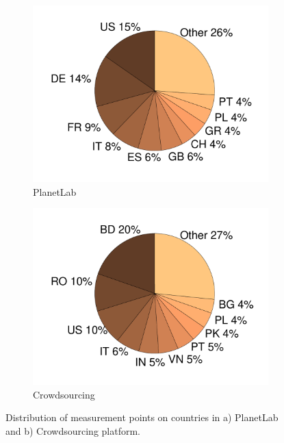 \begin{figure}[bt]
    \centering
	\begin{subfigure}[t]{0.49\textwidth}
	\includegraphics[width=\textwidth]{aslevel/crowd/figs/PLSrc.pdf}
\caption{PlanetLab}
\label{fig:PLSrc}
\end{subfigure}
\begin{subfigure}[t]{0.49\textwidth}
	\includegraphics[width=\textwidth]{aslevel/crowd/figs/MWSrc.pdf}
\caption{Crowdsourcing}
 	\label{fig:MWSrc}
\end{subfigure}
    \caption{Distribution of measurement points on countries in a) PlanetLab and b) Crowdsourcing platform.}
    \label{fig:Src}
\end{figure}


